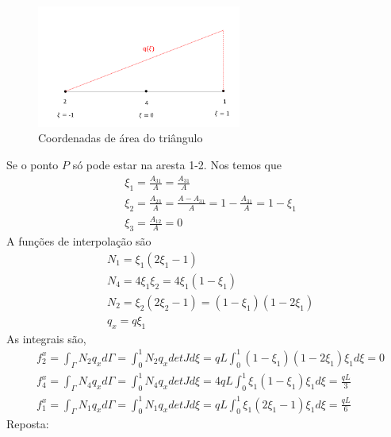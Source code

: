 \begin{figure}[H]
	\includegraphics[width=0.6\textwidth,center]{fig/q1_prova_2012.PNG}
	\caption{Coordenadas de área do triângulo} 
	\label{provas:coordenadas_de_area}
\end{figure}
%
Se o ponto $P$ só pode estar na aresta 1-2. Nos temos que
%
\begin{equation}
	\begin{split}
		&\xi_1 = \frac{A_{31}}{A} = \frac{A_{31}}{A}\\
    	&\xi_2 = \frac{A_{23}}{A} = \frac{A - A_{31}}{A} = 1 -  \frac{A_{31}}{A} = 1 - \xi_1\\
		&\xi_3 = \frac{A_{12}}{A} = 0
	\end{split}
\end{equation} 
%
A funções de interpolação são
%
\begin{equation}
	\begin{split}
		&N_1 = \xi_1 (2 \xi_1 - 1) \\ 
		&N_4 = 4 \xi_1 \xi_2 = 4 \xi_1 (1 - \xi_1)\\ 
		&N_2 = \xi_2 (2 \xi_2 - 1) = (1 - \xi_1) (1 - 2 \xi_1)\\
		&q_x = q \xi_1
	\end{split}  
\end{equation}
%
As integrais são,
\begin{equation}
	\begin{split}
		&f_2^x = \int_{\Gamma} N_2 q_x d\Gamma = \int_{0}^{1} N_2 q_x det J d\xi = q L \int_{0}^{1} (1 - \xi_1) (1 - 2 \xi_1) \xi_1 d\xi = 0\\
		&f_4^x = \int_{\Gamma} N_4 q_x d\Gamma = \int_{0}^{1} N_4 q_x det J d\xi = 4 q L \int_{0}^{1} \xi_1 (1 - \xi_1) \xi_1 d\xi =  \frac{q L}{3}\\
		&f_1^x = \int_{\Gamma} N_1 q_x d\Gamma = \int_{0}^{1} N_1 q_x det J d\xi = q L \int_{0}^{1} \xi_1 (2\xi_1 - 1) \xi_1  d\xi =  \frac{q L}{6}
	\end{split}
\end{equation}
%
\color{blue}
Reposta:
